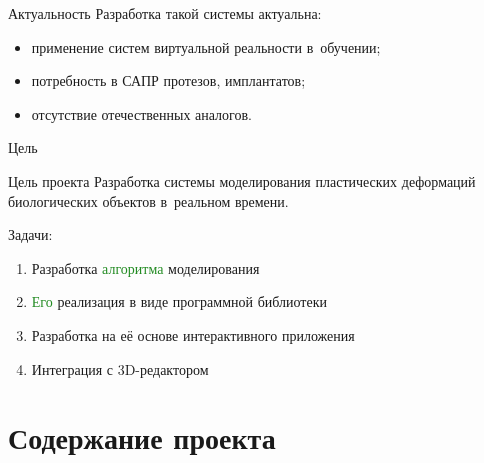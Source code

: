 \documentclass[usenames,dvipsnames,pdftex,unicode,hidelinks]{beamer}
\newcommand{\grn}[1]{\textcolor{ForestGreen}{#1}}
\newcommand{\ppl}[1]{\textcolor{RoyalPurple}{#1}}
\newcommand{\blu}[1]{\textcolor{NavyBlue}{#1}}
\begin{document}
  \begin{frame}{Актуальность}
    Разработка такой системы актуальна:
    \begin{itemize}
      \item применение систем виртуальной реальности \alert{в~обучении};
      \item потребность в \alert{САПР} протезов, имплантатов;
      \item отсутствие \alert{отечественных} аналогов.
    \end{itemize}

    \vspace{0.5cm}

  \end{frame}

  \begin{frame}{Цель}
    \begin{block}{Цель проекта}
      Разработка \alert{системы моделирования} пластических деформаций биологических объектов
      \alert{в~реальном времени}.
    \end{block}

    \vspace{0.5cm}

    Задачи:
    \begin{enumerate}
      \item Разработка \grn{алгоритма} моделирования
      \item \grn{Его} реализация в виде \ppl{программной библиотеки}
      \item Разработка на \ppl{её} основе \blu{интерактивного приложения}
      \item<new@1-> Интеграция с 3D-редактором
    \end{enumerate}
  \end{frame}

  \section{Содержание проекта}
\end{document}
